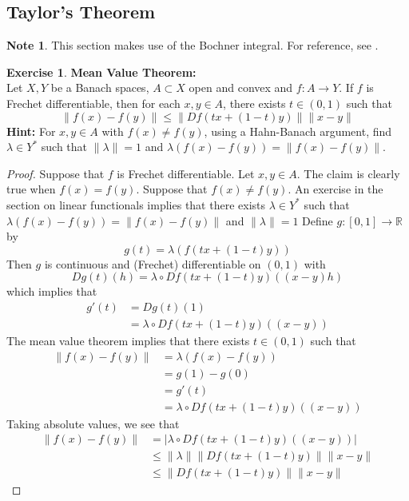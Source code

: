\documentclass[12pt]{amsart}
\theoremstyle{definition}
\newtheorem{note}[definition]{Note}
\newtheorem{ex}[definition]{Exercise}
\newcommand{\lam}{\lambda}
\newcommand{\R}{\mathbb{R}}
\begin{document}
	
	
	
	
	
	
	\newpage
	\subsection{Taylor's Theorem}	
	
	\begin{note}
	This section makes use of the Bochner integral. For reference, see .
	\end{note}
	\begin{ex}\textbf{Mean Value Theorem:}\\
	Let $X, Y$ be a Banach spaces, $A \subset X$ open and convex and $f:A \rightarrow Y$. If $f$ is Frechet differentiable, then for each $x,y \in A$, there exists $t \in (0,1)$ such that $$\|f(x) - f(y)\| \leq \|Df(tx + (1-t)y)\|\|x-y\|$$
	\textbf{Hint:} For $x,y \in A$ with $f(x) \neq f(y)$, using a Hahn-Banach argument, find $\lam \in Y^*$ such that $\|\lam\| = 1 $ and $\lam (f(x) - f(y)) = \|f(x) - f(y)\|$.
	\end{ex}
	
	\begin{proof}
	Suppose that $f$ is Frechet differentiable. Let $x,y \in A$. The claim is clearly true when $f(x) = f(y)$. Suppose that $f(x) \neq f(y)$. An exercise in the section on linear functionals implies that there exists $\lam \in Y^*$ such that $\lam(f(x)-f(y)) = \| f(x) - f(y)\|$ and $\|\lam \| = 1$
	Define $g:[0,1] \rightarrow \R$ by $$g(t) = \lam(f(tx +(1-t)y))$$ Then $g$ is continuous and (Frechet) differentiable on $(0,1)$ with $$Dg(t)(h) = \lam \circ Df(tx+(1-t)y)((x-y)h)$$ which implies that
	\begin{align*}
	g'(t) 
	&= Dg(t)(1)\\
	&= \lam \circ Df(tx+(1-t)y)((x-y))
	\end{align*}
	The mean value theorem implies that there exists $t \in (0,1)$ such that 
	\begin{align*}
	\|f(x) - f(y)\|
	&= \lam(f(x) - f(y)) \\
	&= g(1) - g(0) \\
	&= g'(t)\\
	&= \lam \circ Df(tx+(1-t)y)((x-y))
	\end{align*}
	Taking absolute values, we see that 
	\begin{align*}
	\|f(x) - f(y)\|
	&= |\lam \circ Df(tx+(1-t)y)((x-y))| \\
	& \leq \|\lam \| \|Df(tx+(1-t)y)\|\|x-y\| \\
	& \leq \|Df(tx+(1-t)y)\|\|x-y\|
	\end{align*}
	\end{proof}
	
\end{document}
